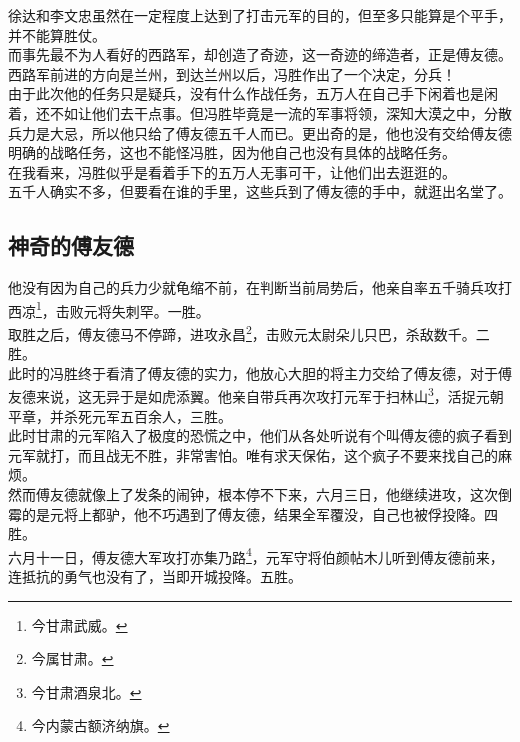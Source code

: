 \begin{multicols}{\theparacolNo}
徐达和李文忠虽然在一定程度上达到了打击元军的目的，但至多只能算是个平手，并不能算胜仗。\\

而事先最不为人看好的西路军，却创造了奇迹，这一奇迹的缔造者，正是傅友德。\\

西路军前进的方向是兰州，到达兰州以后，冯胜作出了一个决定，分兵！\\

由于此次他的任务只是疑兵，没有什么作战任务，五万人在自己手下闲着也是闲着，还不如让他们去干点事。但冯胜毕竟是一流的军事将领，深知大漠之中，分散兵力是大忌，所以他只给了傅友德五千人而已。更出奇的是，他也没有交给傅友德明确的战略任务，这也不能怪冯胜，因为他自己也没有具体的战略任务。\\

在我看来，冯胜似乎是看着手下的五万人无事可干，让他们出去逛逛的。\\

五千人确实不多，但要看在谁的手里，这些兵到了傅友德的手中，就逛出名堂了。\\

\subsection{神奇的傅友德}
他没有因为自己的兵力少就龟缩不前，在判断当前局势后，他亲自率五千骑兵攻打西凉\footnote{今甘肃武威。}，击败元将失刺罕。一胜。\\

取胜之后，傅友德马不停蹄，进攻永昌\footnote{今属甘肃。}，击败元太尉朵儿只巴，杀敌数千。二胜。\\

此时的冯胜终于看清了傅友德的实力，他放心大胆的将主力交给了傅友德，对于傅友德来说，这无异于是如虎添翼。他亲自带兵再次攻打元军于扫林山\footnote{今甘肃酒泉北。}，活捉元朝平章，并杀死元军五百余人，三胜。\\

此时甘肃的元军陷入了极度的恐慌之中，他们从各处听说有个叫傅友德的疯子看到元军就打，而且战无不胜，非常害怕。唯有求天保佑，这个疯子不要来找自己的麻烦。\\

然而傅友德就像上了发条的闹钟，根本停不下来，六月三日，他继续进攻，这次倒霉的是元将上都驴，他不巧遇到了傅友德，结果全军覆没，自己也被俘投降。四胜。\\

六月十一日，傅友德大军攻打亦集乃路\footnote{今内蒙古额济纳旗。}，元军守将伯颜帖木儿听到傅友德前来，连抵抗的勇气也没有了，当即开城投降。五胜。\\


\end{multicols}
